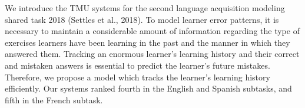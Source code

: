 We introduce the TMU systems for the second language acquisition modeling shared task 2018 (Settles et al., 2018). To model learner error patterns, it is necessary to maintain a considerable amount of information regarding the type of exercises learners have been learning in the past and the manner in which they answered them. Tracking an enormous learner's learning history and their correct and mistaken answers is essential to predict the learner's future mistakes. Therefore, we propose a model which tracks the learner's learning history efficiently. Our systems ranked fourth in the English and Spanish subtasks, and fifth in the French subtask.
